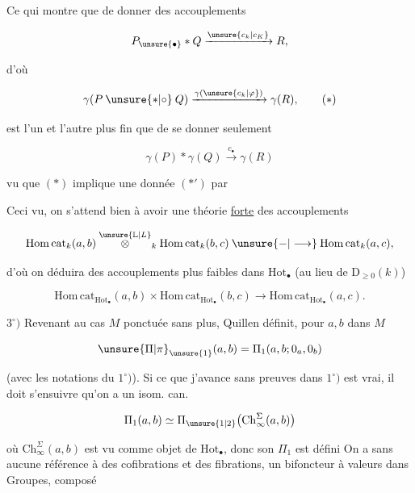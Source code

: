 Ce qui montre que de donner des accouplements

\[
 P_{\unsure{\bullet}}\mathbin{*}Q\xrightarrow{\unsure{c_k|c_K}}R,
\]

d'où

\[
 \gamma(P\mathbin{\unsure{*|\circ}}Q)\xrightarrow{\gamma(\unsure{c_k|\varphi})}\gamma(R),\tag*{$(*)$}
\]

est l'un et l'autre plus fin que de se donner seulement

\[
 \gamma(P)\mathbin{*}\gamma(Q)\xrightarrow{c_\bullet}\gamma(R)\tag*{$(*')$}
\]

vu que  $(*)$ implique une donnée $(*')$ par


Ceci vu, on s'attend bien à avoir une théorie \uline{forte} des accouplements

\[
 \mathrm{Hom\,cat}_k(a,b)\overset{\unsure{\mathbb L|L}}{\otimes}_k\mathrm{Hom\,cat}_k(b,c)\mathbin{\unsure{-|\longrightarrow}}\mathrm{Hom\,cat}_k(a,c),
\]

d'où on déduira des accouplements plus faibles dans $\mathrm{Hot}_{\bullet}$ (au lieu de $\mathrm D_{\geq 0}(k)$)

\[
 \mathrm{Hom\,cat}_{\mathrm{Hot}_{\bullet}}(a,b)\times
 \mathrm{Hom\,cat}_{\mathrm{Hot}_{\bullet}}(b,c)\longrightarrow
 \mathrm{Hom\,cat}_{\mathrm{Hot}_{\bullet}}(a,c).
\]

$3^\circ)$ Revenant au cas $M$ ponctuée sans plus, Quillen définit, pour $a,b$ dans $M$

\[
 \unsure{\Pi|\pi}_{\unsure{1}}(a,b)=\Pi_1(a,b;0_a,0_b)
\]


(avec les notations du $1^\circ)$). Si ce que j'avance sans preuves dans $1^\circ)$ est vrai, il doit s'ensuivre qu'on a un isom. can.

\[
 \Pi_1(a,b)\simeq\Pi_{\unsure{1|2}}\bigl(\mathrm{Ch}^{\Sigma}_{\infty}(a,b)\bigr)
\]

où $\mathrm{Ch}^{\Sigma}_{\infty}(a,b)$ est vu comme objet de $\mathrm{Hot}_{\bullet}$, donc son $\Pi_1$ est défini On a   sans aucune référence à des cofibrations et des fibrations, un bifoncteur à valeurs dans Groupes, composé 

